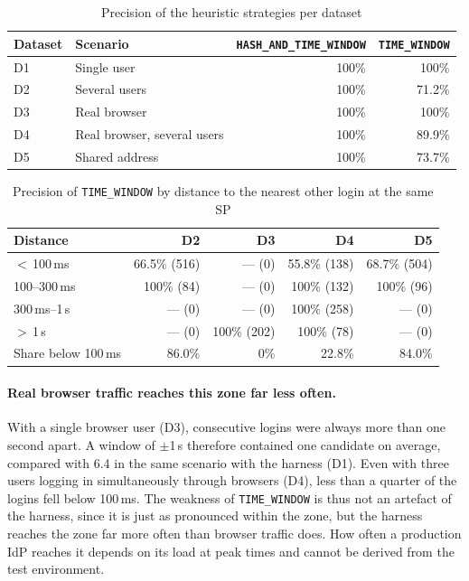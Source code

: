 \documentclass[../main.tex]{subfiles}
\begin{document}
\begin{table}[h]
\centering
\caption{Precision of the heuristic strategies per dataset}\label{tab:correlation-precision}
\small
\begin{tabular}{llrr}
\toprule
Dataset & Scenario & \texttt{HASH\_AND\_TIME\_WINDOW} & \texttt{TIME\_WINDOW} \\
\midrule
D1 & Single user                 & 100\% & 100\%  \\
D2 & Several users               & 100\% & 71.2\% \\
D3 & Real browser                & 100\% & 100\%  \\
D4 & Real browser, several users & 100\% & 89.9\% \\
D5 & Shared address              & 100\% & 73.7\% \\
\bottomrule
\end{tabular}
\end{table}

\begin{table}[h]
\centering
\caption{Precision of \texttt{TIME\_WINDOW} by distance to the nearest other login at the same SP}\label{tab:correlation-density}
\small
\begin{tabular}{lrrrr}
\toprule
Distance & D2 & D3 & D4 & D5 \\
\midrule
$<$\,100\,ms      & 66.5\% (516) & --- (0)     & 55.8\% (138) & 68.7\% (504) \\
100--300\,ms      & 100\% (84)   & --- (0)     & 100\% (132)  & 100\% (96)   \\
300\,ms--1\,s     & --- (0)      & --- (0)     & 100\% (258)  & --- (0)      \\
$>$\,1\,s         & --- (0)      & 100\% (202) & 100\% (78)   & --- (0)      \\
\midrule
Share below 100\,ms & 86.0\%     & 0\%         & 22.8\%       & 84.0\%       \\
\bottomrule
\end{tabular}
\end{table}

\paragraph{Real browser traffic reaches this zone far less often.}
With a single browser user (D3), consecutive logins were always more than one second apart. 
A window of $\pm$1\,s therefore contained one candidate on average, compared with 6.4 in the same 
scenario with the harness (D1). 
Even with three users logging in simultaneously through browsers (D4), less than a quarter of the 
logins fell below 100\,ms. 
The weakness of \texttt{TIME\_\allowbreak{}WINDOW} is thus not an artefact of the harness, since it 
is just as pronounced within the zone, but the harness reaches the zone far more often than browser 
traffic does. 
How often a production IdP reaches it depends on its load at peak times and cannot be derived from 
the test environment. 
\end{document}
